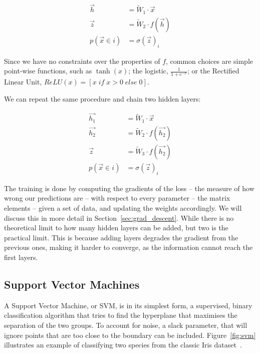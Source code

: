 \begin{align*}
\vec{h} &= \widetilde W_1 \cdot \vec{x} \\
\vec{z} &= \widetilde W_2 \cdot f(\vec{h}) \\
p(\vec x \in i) &= \sigma(\vec z)_i
\end{align*}

Since we have no constraints over the properties of $f$, common choices are simple point-wise functions, such as $\tanh(x)$; the logistic, $\frac{1}{1 + e^{-x}}$; or the Rectified Linear Unit, $ReLU(x)=[x \; if \; x > 0 \; else \; 0]$.

We can repeat the same procedure  and chain two hidden layers:

\begin{align*}
\vec{h_1} &= \widetilde W_1 \cdot \vec{x} \\
\vec{h_2} &= \widetilde W_2 \cdot f(\vec{h_2}) \\
\vec{z} &= \widetilde W_3 \cdot f(\vec{h_2}) \\
p(\vec x \in i) &= \sigma(\vec z)_i
\end{align*}

The training is done by computing the gradients of the loss -- the measure of how wrong our predictions are -- with respect to every parameter -- the matrix elements -- given a set of data, and updating the weights accordingly.
We will discuss this in more detail in Section~\ref{sec:grad_descent}.
While there is no theoretical limit to how many hidden layers can be added, but two is the practical limit.
This is because adding layers degrades the gradient from the previous ones, making it harder to converge, as the information cannot reach the first layers.


\subsection{Support Vector Machines}
A Support Vector Machine, or SVM, is in its simplest form, a supervised, binary classification algorithm that tries to find the hyperplane that maximises the separation of the two groups.
To account for noise, a slack parameter, that will ignore points that are too close to the boundary can be included.
Figure~\ref{fig:svm} illustrates an example of classifying two species from the classic Iris dataset~\citep{iris_dataset}.


